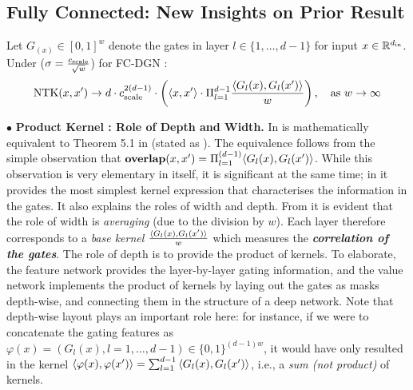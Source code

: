 %
\subsection{Fully Connected: New Insights on Prior Result}
\begin{theorem}
\label{th:fc} Let $G_(x)\in[0,1]^w$ denote the gates in layer $l\in\{1,\ldots,d-1\}$ for input $x\in\mathbb{R}^{d_{\text{in}}}$. Under   ($\sigma=\frac{c_{\text{scale}}}{\sqrt{w}}$) for FC-DGN : 
\begin{align*}
\text{NTK}(x,x') \rightarrow d \cdot c_{\text{scale}}^{2(d-1)} \cdot \left(\langle  x,x'\rangle \cdot \Pi_{l=1}^{d-1} \frac{\langle G_l(x),G_l(x')\rangle}w\right), \quad\text{as}\,\, w\rightarrow \infty 
\end{align*}
\end{theorem} 
$\bullet$ \textbf{Product Kernel : Role of Depth and Width.} In  is mathematically equivalent to Theorem 5.1 in \citep{npk} (stated as ). The equivalence follows from the simple observation that $\textbf{overlap}(x,x')=\Pi_{l=1}^{(d-1)}\langle G_l(x),G_l(x')\rangle$. While this observation is very elementary in itself, it is significant at the same time; in  it provides the most simplest kernel expression that characterises the information in the gates. It also explains the roles of width and depth.  From  it is evident that the role of width is \emph{averaging} (due to the division by $w$). Each layer therefore corresponds to a \emph{base kernel} $\frac{\langle G_l(x),G_l(x')\rangle}w$ which measures the \emph{\textbf{correlation of the gates}}. The role of depth is to provide the product of kernels. To elaborate, the feature network provides the layer-by-layer gating information, and the value network implements the product of kernels by laying out the gates as masks depth-wise, and connecting them in the structure of a deep network. Note that depth-wise layout plays an important role here: for instance, if we were to concatenate the gating features as $\varphi(x)=(G_l(x),l=1,\ldots,d-1)\in\{0,1\}^{(d-1)w}$, it would have only resulted in the kernel $\langle \varphi(x),\varphi(x')\rangle=\sum_{l=1}^{d-1}{\langle G_l(x),G_l(x')\rangle}$, i.e., a \emph{sum  (not product)} of kernels. 

